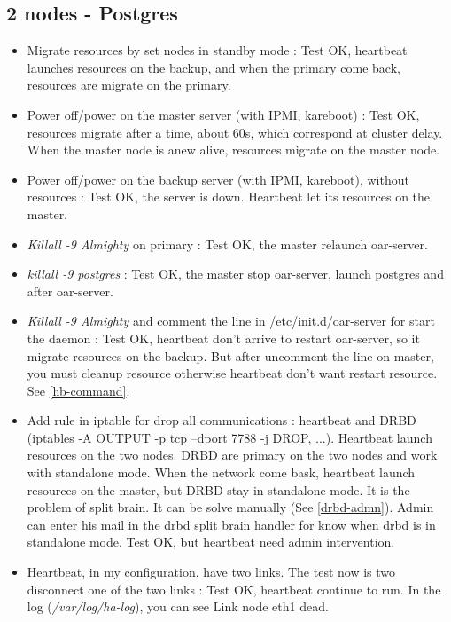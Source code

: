 \documentclass[a4paper,10pt]{report}
\begin{document}
\subsection{2 nodes - Postgres}
\begin{itemize}
 \item Migrate resources by set nodes in standby mode : Test OK, heartbeat launches resources on the backup, and when the primary come back, resources are migrate on the primary.
 \item Power off/power on the master server (with IPMI, kareboot) : Test OK, resources migrate after a time, about 60s, which correspond at cluster delay. When the master node is anew alive, resources migrate on the master node.
 \item Power off/power on the backup server (with IPMI, kareboot), without resources : Test OK, the server is down. Heartbeat let its resources on the master.
 \item \textit{Killall -9 Almighty} on primary : Test OK, the master relaunch oar-server.
 \item \textit{killall -9 postgres} : Test OK, the master stop oar-server, launch postgres and after oar-server.
 \item \textit{Killall -9 Almighty} and comment the line in /etc/init.d/oar-server for start the daemon : Test OK, heartbeat don't arrive to restart oar-server, so it migrate resources on the backup.
But after uncomment the line on master, you must cleanup resource otherwise heartbeat don't want restart resource. See \ref{hb-command}.
 \item Add rule in iptable for drop all communications : heartbeat and DRBD (iptables -A OUTPUT -p tcp --dport 7788 -j DROP, ...). Heartbeat launch resources on the two nodes. DRBD are primary on the two nodes and work with standalone mode. When the network come bask, heartbeat launch resources on the master, but DRBD stay in standalone mode. It is the problem of split brain. It can be solve manually (See \ref{drbd-admn}).
Admin can enter his mail in the drbd split brain handler for know when drbd is in standalone mode. Test OK, but heartbeat need admin intervention.
 \item Heartbeat, in my configuration, have two links. The test now is two disconnect one of the two links : Test OK, heartbeat continue to run. In the log (\textit{/var/log/ha-log}), you can see Link node eth1 dead.
\end{itemize}
\end{document}
